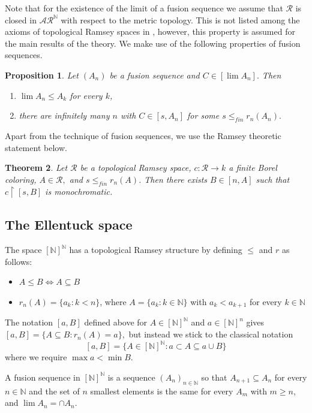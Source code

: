 \documentclass[11pt]{amsart}
\newcommand{\N}{\mathbb{N}}
\renewcommand{\restriction}[2]{#1 \upharpoonright #2}
\newtheorem{theorem}{Theorem}[section]
\newtheorem{proposition}[theorem]{Proposition}
\theoremstyle{definition}
\numberwithin{equation}{section}
\newcommand{\rstr}{\restriction}
\newcommand{\sse}{\subseteq}
\newcommand{\fA}{\mathcal{A}}
\newcommand{\fR}{\mathcal{R}}
\begin{document}
	Note that for the existence of the limit of a fusion sequence we assume that $\fR$ is closed in $\fA\fR^\N$ with respect to the metric topology. This is not listed among the axioms of topological Ramsey spaces in \cite{ramseyspaces}, however, this property is assumed for the main results of the theory. We make use of the following properties of fusion sequences.


	
	\begin{proposition}\label{fusion}
		Let $(A_n)$ be a fusion sequence and $C\in[\lim A_n].$ Then 
        \begin{enumerate}
            \item $\lim A_n\le A_k$ for every $k$,
            \item there are infinitely many $n$ with $C\in[s,A_n]$ for some $s\le_{fin}r_n(A_n).$
        \end{enumerate}
	\end{proposition}
	
	Apart from the technique of fusion sequences, we use the Ramsey theoretic statement below.
	
	\begin{theorem}\label{ramsey property}
		Let $\fR$ be a topological Ramsey space, $c:\fR\to k$ a finite Borel coloring, $A\in\fR,$ and $s\le_{fin}r_n(A)$. Then there exists $B\in[n,A]$ such that $\rstr{c}{[s,B]}$ is monochromatic.
	\end{theorem}
	

	
	\subsection{The Ellentuck space} The space $[\N]^\N$ has a topological Ramsey structure by defining $\le$ and $r$ as follows:

    \begin{itemize}
        \item $A\le B\iff A\sse B$
        \item $r_n(A)=\{a_k: k< n\}$, where $A=\{a_k:k\in\N\}$ with $a_k<a_{k+1}$ for every $k\in\N$
    \end{itemize}
    
    The notation $[a,B]$ defined above for $A\in[\N]^\N$ and $a\in[\N]^n$ gives $[a,B]=\{A\sse B: r_n(A)=a\},$ but instead we stick to the classical notation \[[a,B]=\{A\in[\N]^\N: a\subset A\sse a\cup B\}\] where we require $\max a<\min B.$
	
	A fusion sequence in $[\N]^\N$ is a sequence $(A_n)_{n\in\N}$ so that $A_{n+1}\sse A_n$ for every $n\in\N$ and the set of $n$ smallest elements is the same for every $A_m$ with $m\ge n$, and $\lim A_n =\cap A_n$. 
	
\end{document}
